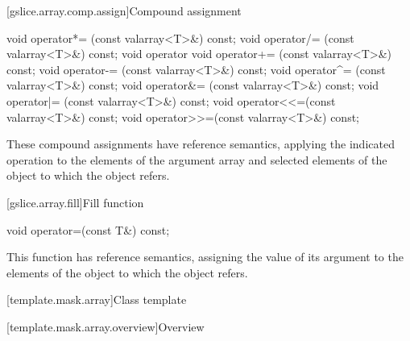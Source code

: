 [gslice.array.comp.assign]{Compound assignment}

%
%
%
%
%
%
%
%
%
%
\begin{itemdecl}
void operator*= (const valarray<T>&) const;
void operator/= (const valarray<T>&) const;
void operator%
void operator+= (const valarray<T>&) const;
void operator-= (const valarray<T>&) const;
void operator^= (const valarray<T>&) const;
void operator&= (const valarray<T>&) const;
void operator|= (const valarray<T>&) const;
void operator<<=(const valarray<T>&) const;
void operator>>=(const valarray<T>&) const;
\end{itemdecl}

\begin{itemdescr}
\pnum
These compound assignments have reference semantics, applying the
indicated operation to the elements of the argument array and selected
elements of the
object to which the
object refers.
\end{itemdescr}

[gslice.array.fill]{Fill function}

%
\begin{itemdecl}
void operator=(const T&) const;
\end{itemdecl}

\begin{itemdescr}
\pnum
This function has reference semantics, assigning the value of its argument
to the elements of the
object to which the
object refers.
\end{itemdescr}

[template.mask.array]{Class template }

[template.mask.array.overview]{Overview}

